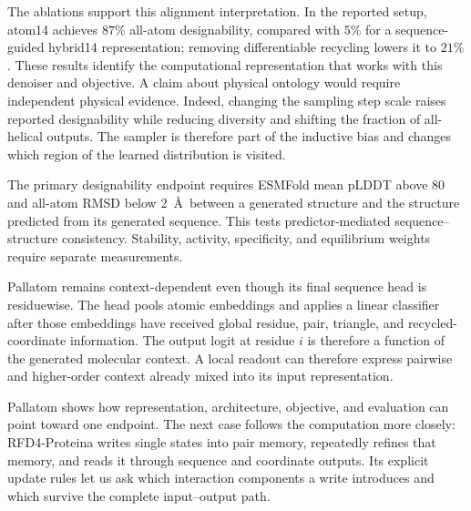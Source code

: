 The ablations support this alignment interpretation.  In the reported setup, atom14 achieves
$87\%$ all-atom designability, compared with $5\%$ for a sequence-guided hybrid14 representation;
removing differentiable recycling lowers it to $21\%$.  These results identify the computational
representation that works with this denoiser and objective.  A claim about physical ontology would
require independent physical evidence.  Indeed, changing the sampling step scale raises reported
designability while reducing diversity and shifting the fraction of all-helical outputs.  The
sampler is therefore part of the inductive bias and changes which region of the learned
distribution is visited.

The primary designability endpoint requires ESMFold mean pLDDT above 80 and all-atom RMSD below
$2$~\AA\ between a generated structure and the structure predicted from its generated sequence.
This tests predictor-mediated sequence--structure consistency.  Stability, activity, specificity,
and equilibrium weights require separate measurements.

Pallatom remains context-dependent even though its final sequence head is residuewise.  The head
pools atomic embeddings and applies a linear classifier after those embeddings have received global
residue, pair, triangle, and recycled-coordinate information.  The output logit at residue $i$ is
therefore a function of the generated molecular context.  A
local readout can therefore express pairwise and higher-order context already mixed into its input
representation.

Pallatom shows how representation, architecture, objective, and evaluation can point toward one
endpoint.  The next case follows the computation more closely: RFD4-Proteina writes single states
into pair memory, repeatedly refines that memory, and reads it through sequence and coordinate
outputs.  Its explicit update rules let us ask which interaction components a write introduces and
which survive the complete input--output path.
